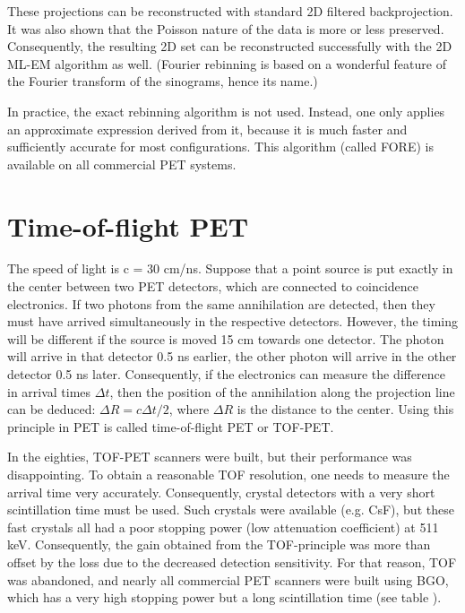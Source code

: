 These projections can be reconstructed with standard 2D filtered
backprojection.  It was also shown that the Poisson nature of the data
is more or less preserved.  Consequently, the resulting 2D set can be
reconstructed successfully with the 2D ML-EM algorithm as
well. (Fourier rebinning is based on a wonderful feature of the
Fourier transform of the sinograms, hence its name.)

In practice, the exact rebinning algorithm is not used. Instead, one
only applies an approximate expression derived from it, because it is
much faster and sufficiently accurate for most configurations. This
algorithm (called FORE) is available on all commercial PET systems.

\section{Time-of-flight PET \label{sec:TOF}}
The speed of light is c = 30 cm/ns. Suppose that a point source is put
exactly in the center between two PET detectors, which are connected
to coincidence electronics. If two photons from the same annihilation
are detected, then they must have arrived simultaneously in the
respective detectors. However, the timing will be different if the
source is moved 15 cm towards one detector. The photon will arrive in
that detector 0.5 ns earlier, the other photon will arrive in the
other detector 0.5 ns later. Consequently, if the electronics can
measure the difference in arrival times $\Delta t$, then the position
of the annihilation along the projection line can be deduced: $\Delta
R = c \Delta t / 2$, where $\Delta R$ is the distance to the
center. Using this principle in PET is called time-of-flight PET or
TOF-PET.

In the eighties, TOF-PET scanners were built, but their performance
was disappointing. To obtain a reasonable TOF resolution, one needs to
measure the arrival time very accurately. Consequently, crystal
detectors with a very short scintillation time must be used. Such
crystals were available (e.g. CsF), but these fast crystals all had a
poor stopping power (low attenuation coefficient) at 511
keV. Consequently, the gain obtained from the TOF-principle was more
than offset by the loss due to the decreased detection
sensitivity. For that reason, TOF was abandoned, and nearly all
commercial PET scanners were built using BGO, which has a very high
stopping power but a long scintillation time (see table
).

